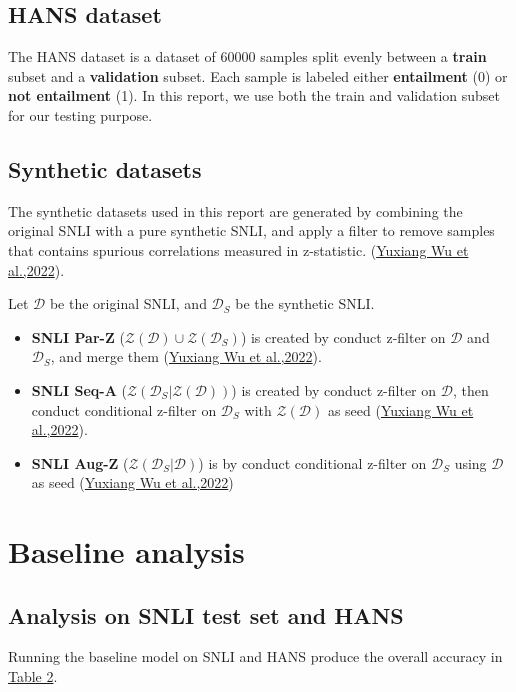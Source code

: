 \documentclass{article}
\begin{document}
\subsection{HANS dataset}
The HANS dataset is a dataset of 60000 samples split evenly between a \textbf{train} subset and a \textbf{validation} subset.
Each sample is labeled either \textbf{entailment} (0) or \textbf{not entailment} (1).
In this report, we use both the train and validation subset for our testing purpose.

\subsection{Synthetic datasets}
The synthetic datasets used in this report are generated by combining the original SNLI with a pure synthetic SNLI, and apply a filter to remove samples that contains spurious correlations measured in z-statistic. (\hyperref[ref2]{Yuxiang Wu et al.,2022}).

Let $\mathcal{D}$ be the original SNLI, and $\mathcal{D}_{S}$ be the synthetic SNLI.
\begin{itemize}
  \item \textbf{SNLI Par-Z} ({\it$\mathcal{Z}(\mathcal{D}) \cup \mathcal{Z}(\mathcal{D}_{S})$}) is created by conduct z-filter on $\mathcal{D}$ and $\mathcal{D}_{S}$, and merge them (\hyperref[ref2]{Yuxiang Wu et al.,2022}).
  \item \textbf{SNLI Seq-A} ({\it$\mathcal{Z}(\mathcal{D}_{S}|\mathcal{Z}(\mathcal{D}))$}) is created by conduct z-filter on $\mathcal{D}$, then conduct conditional z-filter on $\mathcal{D}_{S}$ with $\mathcal{Z}(\mathcal{D})$ as seed (\hyperref[ref2]{Yuxiang Wu et al.,2022}).
  \item \textbf{SNLI Aug-Z} ({\it $\mathcal{Z}(\mathcal{D}_{S}|\mathcal{D})$}) is by conduct conditional z-filter on  $\mathcal{D}_{S}$ using $\mathcal{D}$ as seed (\hyperref[ref2]{Yuxiang Wu et al.,2022})
\end{itemize}

\section{Baseline analysis}
\subsection{Analysis on SNLI test set and HANS}
Running the baseline model on SNLI and HANS produce the overall accuracy in \hyperref[table2]{Table 2}.
\end{document}
